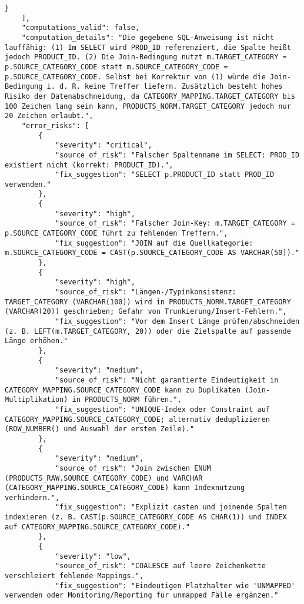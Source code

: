 \begin{lstlisting}[caption={Ausgabe: GPT-5 Anwendungsfall 6 Robustheitsdurchlauf},label={gpt_case6_prompt3}]
        }
    ],
    "computations_valid": false,
    "computation_details": "Die gegebene SQL-Anweisung ist nicht lauffähig: (1) Im SELECT wird PROD_ID referenziert, die Spalte heißt jedoch PRODUCT_ID. (2) Die Join-Bedingung nutzt m.TARGET_CATEGORY = p.SOURCE_CATEGORY_CODE statt m.SOURCE_CATEGORY_CODE = p.SOURCE_CATEGORY_CODE. Selbst bei Korrektur von (1) würde die Join-Bedingung i. d. R. keine Treffer liefern. Zusätzlich besteht hohes Risiko der Datenabschneidung, da CATEGORY_MAPPING.TARGET_CATEGORY bis 100 Zeichen lang sein kann, PRODUCTS_NORM.TARGET_CATEGORY jedoch nur 20 Zeichen erlaubt.",
    "error_risks": [
        {
            "severity": "critical",
            "source_of_risk": "Falscher Spaltenname im SELECT: PROD_ID existiert nicht (korrekt: PRODUCT_ID).",
            "fix_suggestion": "SELECT p.PRODUCT_ID statt PROD_ID verwenden."
        },
        {
            "severity": "high",
            "source_of_risk": "Falscher Join-Key: m.TARGET_CATEGORY = p.SOURCE_CATEGORY_CODE führt zu fehlenden Treffern.",
            "fix_suggestion": "JOIN auf die Quellkategorie: m.SOURCE_CATEGORY_CODE = CAST(p.SOURCE_CATEGORY_CODE AS VARCHAR(50))."
        },
        {
            "severity": "high",
            "source_of_risk": "Längen-/Typinkonsistenz: TARGET_CATEGORY (VARCHAR(100)) wird in PRODUCTS_NORM.TARGET_CATEGORY (VARCHAR(20)) geschrieben; Gefahr von Trunkierung/Insert-Fehlern.",
            "fix_suggestion": "Vor dem Insert Länge prüfen/abschneiden (z. B. LEFT(m.TARGET_CATEGORY, 20)) oder die Zielspalte auf passende Länge erhöhen."
        },
        {
            "severity": "medium",
            "source_of_risk": "Nicht garantierte Eindeutigkeit in CATEGORY_MAPPING.SOURCE_CATEGORY_CODE kann zu Duplikaten (Join-Multiplikation) in PRODUCTS_NORM führen.",
            "fix_suggestion": "UNIQUE-Index oder Constraint auf CATEGORY_MAPPING.SOURCE_CATEGORY_CODE; alternativ deduplizieren (ROW_NUMBER() und Auswahl der ersten Zeile)."
        },
        {
            "severity": "medium",
            "source_of_risk": "Join zwischen ENUM (PRODUCTS_RAW.SOURCE_CATEGORY_CODE) und VARCHAR (CATEGORY_MAPPING.SOURCE_CATEGORY_CODE) kann Indexnutzung verhindern.",
            "fix_suggestion": "Explizit casten und joinende Spalten indexieren (z. B. CAST(p.SOURCE_CATEGORY_CODE AS CHAR(1)) und INDEX auf CATEGORY_MAPPING.SOURCE_CATEGORY_CODE)."
        },
        {
            "severity": "low",
            "source_of_risk": "COALESCE auf leere Zeichenkette verschleiert fehlende Mappings.",
            "fix_suggestion": "Eindeutigen Platzhalter wie 'UNMAPPED' verwenden oder Monitoring/Reporting für unmapped Fälle ergänzen."

\end{lstlisting}
